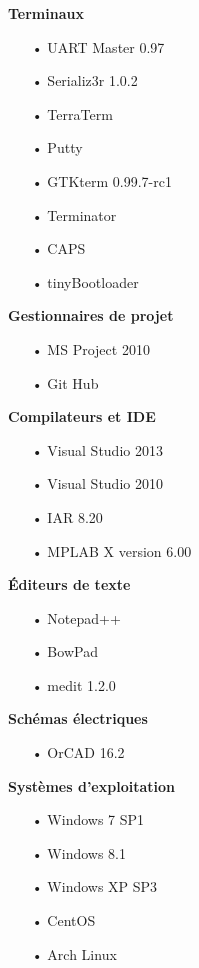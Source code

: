 \documentclass[10pt,a4paper,final]{article}
\begin{document}
\begin{spacing}{1.5}
\begin{flushleft}
\begin{multicols}{3}

\textbf{Terminaux}
\begin{itemize}
\item[•]UART Master 0.97
\item[•]Serializ3r 1.0.2
\item[•]TerraTerm
\item[•]Putty
\item[•]GTKterm 0.99.7-rc1
\item[•]Terminator
\item[•]CAPS
\item[•]tinyBootloader
\end{itemize}

\textbf{Gestionnaires de projet}
\begin{itemize}
\item[•]MS Project 2010
\item[•]Git Hub
\end{itemize}

\textbf{Compilateurs et IDE}
\begin{itemize}
\item[•]Visual Studio 2013
\item[•]Visual Studio 2010
\item[•]IAR 8.20
\item[•]MPLAB X version 6.00
\end{itemize}

\textbf{Éditeurs de texte}
\begin{itemize}
\item[•]Notepad++
\item[•]BowPad
\item[•]medit 1.2.0
\end{itemize}
\textbf{Schémas électriques}

\begin{itemize}
\item[•]OrCAD 16.2
\end{itemize}

\bigskip

\textbf{Systèmes d'exploitation}
\begin{itemize}
\item[•]Windows 7 SP1
\item[•]Windows 8.1
\item[•]Windows XP SP3
\item[•]CentOS
\item[•]Arch Linux
\end{itemize}


\end{multicols}
\end{flushleft}
\end{spacing}
\end{document}

